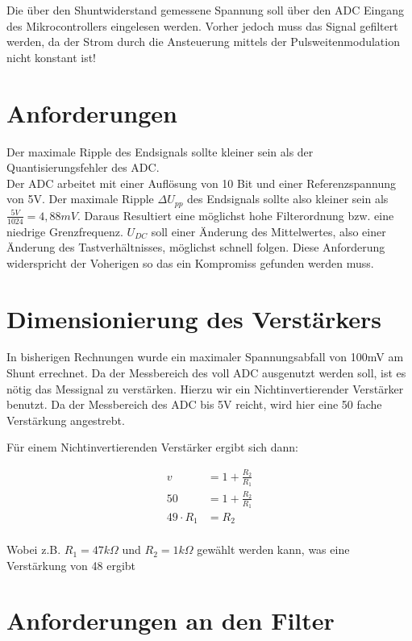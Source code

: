 \documentclass[11pt,twoside,openright]{mpreport}
\begin{document}
Die über den Shuntwiderstand gemessene Spannung soll über den ADC Eingang des Mikrocontrollers eingelesen werden. Vorher jedoch muss das Signal gefiltert werden, da der Strom
durch die Ansteuerung mittels der Pulsweitenmodulation nicht konstant ist!



\section{Anforderungen}
Der maximale Ripple des Endsignals sollte kleiner sein als der Quantisierungsfehler des ADC.\\
Der ADC arbeitet mit einer Auflösung von 10 Bit und einer Referenzspannung von 5V. Der maximale
Ripple $\Delta U_{pp}$ des Endsignals sollte also kleiner sein als $\frac{5V}{1024}=4,88mV$.
Daraus Resultiert eine möglichst hohe Filterordnung bzw. eine niedrige Grenzfrequenz.
$U_{DC}$ soll einer Änderung des Mittelwertes, also einer Änderung des Tastverhältnisses, möglichst
schnell folgen. Diese Anforderung widerspricht der Voherigen so das ein Kompromiss gefunden werden muss.

\section{Dimensionierung des Verstärkers}

In bisherigen Rechnungen wurde ein maximaler Spannungsabfall von 100mV am Shunt errechnet. Da der Messbereich des voll ADC ausgenutzt werden soll,
ist es nötig das Messignal zu verstärken. Hierzu wir ein Nichtinvertierender Verstärker benutzt. Da der Messbereich des ADC bis 5V reicht, wird hier eine 
50 fache Verstärkung angestrebt.

Für einem Nichtinvertierenden Verstärker ergibt sich dann:

\begin{align*}
v &= 1 + \frac{R_2}{R_1}\\
50 &= 1 + \frac{R_2}{R_1}\\
49\cdot R_1 &= R_2
\end{align*}
\\
Wobei z.B. $R_1 = 47 k\Omega$ und $R_2 = 1 k\Omega$  gewählt werden kann, was eine Verstärkung von 48 ergibt






\section{Anforderungen an den Filter}
\end{document}
